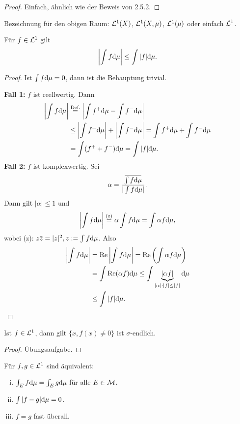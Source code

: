 \begin{proof}
 Einfach, ähnlich wie der Beweis von 2.5.2.
\end{proof}

Bezeichnung für den obigen Raum: $\mathcal{L}^1(X)$, $\mathcal{L}^1(X,\mu)$, $\mathcal{L}^1(\mu)$ oder einfach $\mathcal{L}^1$.

\begin{lem}
 Für $f \in \mathcal{L}^1$ gilt
 \[ \left| \int f \mathrm{d} \mu \right| \le \int |f| \mathrm{d} \mu. \]
\end{lem}

\begin{proof}
 Ist $\int f \mathrm{d} \mu = 0$, dann ist die Behauptung trivial.
 
 \textbf{Fall 1:} $f$ ist reellwertig. Dann
 \[ \begin{aligned}
     \left| \int f \mathrm{d} \mu \right| &\overset{\text{Def.}}{=} \left| \int f^+ \mathrm{d} \mu - \int f^- \mathrm{d} \mu \right| \\
     &\le \left| \int f^+ \mathrm{d} \mu \right| + \left| \int f^- \mathrm{d} \mu \right|
     = \int f^+ \mathrm{d} \mu + \int f^- \mathrm{d} \mu \\
     &= \int ( f^+ + f^- ) \mathrm{d} \mu = \int |f| \mathrm{d} \mu.
    \end{aligned} \]
 \textbf{Fall 2:} $f$ ist komplexwertig. Sei 
 \[ \alpha = \frac{ \obar{\int f  \diffop \mu} }{ | \int f \diffop \mu |}. \]
 Dann gilt $|\alpha| \le 1$ und
 \[ \left| \int f \mathrm{d} \mu \right| \overset{(\text{z})}{=} \alpha \int f \mathrm{d} \mu = \int \alpha f \mathrm{d} \mu, \]
 wobei (z): $z\obar{z} = |z|^2, z := \int f \diffop \mu$. Also
 \begin{align*}
  \left| \int f \mathrm{d} \mu \right| &= \operatorname{Re} \left| \int f \mathrm{d} \mu \right| = \operatorname{Re} \left( \int \alpha f \mathrm{d} \mu \right) \\
  &= \int \operatorname{Re} (\alpha f) \mathrm{d} \mu \le \int \underbrace{|\alpha f|}_{|\alpha|\cdot|f| \le |f|} \mathrm{d} \mu \\
  &\le \int |f| \mathrm{d} \mu. \qedhere
 \end{align*}
\end{proof}
 
\begin{lem}
 Ist $f \in \mathcal{L}^1$, dann gilt $\{ x, f(x) \ne 0 \}$ ist $\sigma$-endlich.  
\end{lem}

\begin{proof}
 Übungsaufgabe.
\end{proof}

\begin{lem}
 Für $f,g \in \mathcal{L}^1$ sind äquivalent:
 \begin{enumerate}[(i)]
  \item $\int_E f \mathrm{d} \mu =  \int_E g \mathrm{d} \mu$ für alle $E \in \mathcal{M}$.
  \item $\int |f-g| \mathrm{d} \mu = 0$.
  \item $f=g$ fast überall.
 \end{enumerate}
\end{lem}

